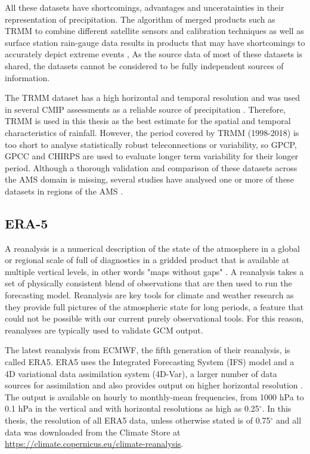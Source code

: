 All these datasets have shortcomings, advantages and unceratainties in their representation of precipitation. The algorithm of merged products such as TRMM to combine different satellite sensors and calibration techniques as well as surface station rain-gauge data results in products that may have shortcomings to accurately depict extreme events \citep{trejo2016}, 
As the source data of most of these datasets is shared, the datasets cannot be considered to be fully independent sources of information. 



The TRMM dataset has a high horizontal and temporal resolution and was used in several CMIP assessments \citep{geil2013,jones2013} as a reliable source of precipitation \citep{carvalho2012}. Therefore, TRMM is used in this thesis as the best estimate for the spatial and temporal characteristics of rainfall. However,
 the period covered by TRMM (1998-2018) is too short to analyse statistically robust teleconnections or variability, so GPCP, GPCC and CHIRPS are used to evaluate longer term variability for their longer period. 
 Although a thorough validation and comparison of these datasets across the AMS domain is missing, several studies have analysed  one or more of these datasets in regions of the AMS \citep[e.g.][]{franchito2009,dinku2010,trejo2016}.

\subsection{ERA-5}


A reanalysis is a numerical description of the state of the atmosphere in a global or regional scale of full of diagnostics in a gridded product that is available at multiple vertical levels, in other words "maps without gaps" \citep{era5hersbach}. A reanalysis takes a set of physically consistent blend of observations that are then used to run the forecasting model. 
Reanalysis are key tools for climate and weather research as they provide full pictures of the atmospheric state for long periods, a feature that could not be possible with our current purely observational tools. For this reason, reanalyses are typically used to validate GCM output. 

The latest reanalysis from ECMWF, the fifth generation of their reanalysis, is called ERA5. 
ERA5 uses the Integrated Forecasting System (IFS) model and a 4D variational data assimilation system (4D-Var), a larger number of data sources for assimilation and also provides output on higher horizontal resolution \citep{era5hersbach}. The output is available on hourly to monthly-mean frequencies, from 1000 hPa to 0.1 hPa in the vertical and with horizontal resolutions as high as 0.25$^\circ$. In this thesis, the resolution of all ERA5 data, unless otherwise stated is of 0.75$^\circ$ and all data was downloaded from the Climate Store at  \url{https://climate.copernicus.eu/climate-reanalysis}.

